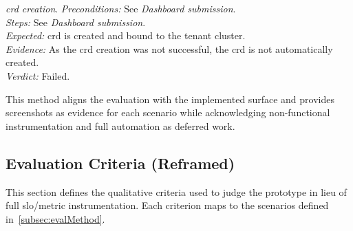 \documentclass[11pt, a4paper, oneside, listof=totoc]{scrartcl}
\begin{document}
\begin{enumerate}[label={[\arabic*]:},
                    ref=Challenge~\arabic*,
                    leftmargin=*,
                    itemsep=0.6\baselineskip]
                    \item\label{chal:evalCRD}
                        \textit{\gls{crd} creation}.
                        \emph{Preconditions:} See \textit{Dashboard submission}.\\
                        \emph{Steps:} See \textit{Dashboard submission}.\\
                        \emph{Expected:} \gls{crd} is created and bound to the tenant cluster. \\
                        \emph{Evidence:} As the \gls{crd} creation was not successful, the \gls{crd}
                        is not automatically created.\\
                        \emph{Verdict:} Failed.
            \end{enumerate}
            This method aligns the evaluation with the implemented surface and provides screenshots
            as evidence for each scenario while acknowledging non-functional instrumentation and
            full automation as deferred work.

        \subsection{Evaluation Criteria (Reframed)}\label{subsec:evaluationCriteria}
            This section defines the qualitative criteria used to judge the prototype in lieu
            of full \gls{slo}/metric instrumentation.
            Each criterion maps to the scenarios defined in~\autoref{subsec:evalMethod}.
\end{document}
